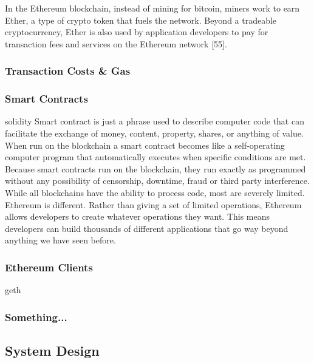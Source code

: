 \documentclass{article}
\begin{document}
In the Ethereum blockchain, instead of mining for bitcoin, miners work to earn Ether, a type of crypto token that fuels the network. Beyond a tradeable cryptocurrency, Ether is also used by application developers to pay for transaction fees and services on the Ethereum network {\Large [55]}.

\cleardoublepage
\subsubsection{Transaction Costs \& Gas}


\cleardoublepage
\subsubsection{Smart Contracts}
solidity
Smart contract is just a phrase used to describe computer code that can facilitate the exchange of money, content, property, shares, or anything of value. When run on the blockchain a smart contract becomes like a self-operating computer program that automatically executes when specific conditions are met. Because smart contracts run on the blockchain, they run exactly as programmed without any possibility of censorship, downtime, fraud or third party interference. While all blockchains have the ability to process code, most are severely limited. Ethereum is different. Rather than giving a set of limited operations, Ethereum allows developers to create whatever operations they want. This means developers can build thousands of different applications that go way beyond anything we have seen before.




\cleardoublepage
\subsubsection{Ethereum Clients}
geth


\cleardoublepage
\subsubsection{Something...}
	

\cleardoublepage
\subsection{System Design}


\end{document}
